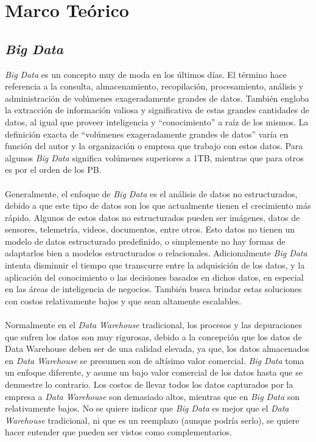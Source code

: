 \section{Marco Te\'orico}
\subsection{\textit{Big Data}}
\textit{Big Data} es un concepto muy de moda en los \'ultimos d\'ias. El t\'ermino hace referencia a la consulta, almacenamiento, recopilaci\'on, procesamiento, an\'alisis y administraci\'on de vol\'umenes exageradamente grandes de datos. Tambi\'en engloba la extracci\'on de informaci\'on valiosa y significativa de estas grandes cantidades de datos, al igual que proveer inteligencia y “conocimiento” a ra\'iz de los mismos. La definici\'on exacta de “vol\'umenes exageradamente grandes de datos” var\'ia en funci\'on del autor y la organizaci\'on o empresa que trabajo con estos datos. Para algunos \textit{Big Data} significa vol\'umenes superiores a 1TB, mientras que para otros es por el orden de los PB.
\paragraph{}
Generalmente, el enfoque de \textit{Big Data} es el an\'alisis de datos no estructurados, debido a que este tipo de datos son los que actualmente tienen el crecimiento m\'as r\'apido. Algunos de estos datos no estructurados pueden ser im\'agenes, datos de sensores, telemetr\'ia, videos, documentos, entre otros. Esto datos no tienen un modelo de datos estructurado predefinido, o simplemente no hay formas de adaptarlos bien a modelos estructurados o relacionales. Adicionalmente \textit{Big Data} intenta disminuir el tiempo que transcurre entre la adquisici\'on de los datos, y la aplicaci\'on del conocimiento o las decisiones basados en dichos datos, en especial en las \'areas de inteligencia de negocios. Tambi\'en busca brindar estas soluciones con costos relativamente bajos y que sean altamente escalables.
\paragraph{}
Normalmente en el \textit{Data Warehouse} tradicional, los procesos y las depuraciones que sufren los datos son muy rigurosas, debido a la concepci\'on que los datos de Data Warehouse deben ser de una calidad elevada, ya que, los datos almacenados en \textit{Data Warehouse} se presumen son de alt\'isimo valor comercial. \textit{Big Data} toma un enfoque diferente, y asume un bajo valor comercial de los datos hasta que se demuestre lo contrario. Los costos de llevar todos los datos capturados por la empresa a \textit{Data Warehouse} son demasiado altos, mientras que en \textit{Big Data} son relativamente bajos. No se quiere indicar que \textit{Big Data} es mejor que el \textit{Data Warehouse} tradicional, ni que es un reemplazo (aunque podr\'ia serlo), se quiere hacer entender que pueden ser vistos
como complementarios.
